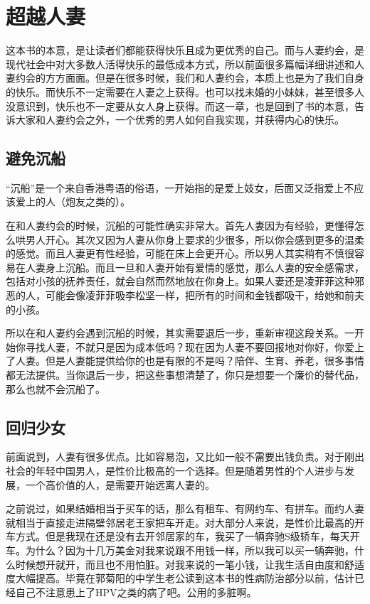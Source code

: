 \chapter{超越人妻}

这本书的本意，是让读者们都能获得快乐且成为更优秀的自己。而与人妻约会，是现代社会中对大多数人活得快乐的最低成本方式，所以前面很多篇幅详细讲述和人妻约会的方方面面。但是在很多时候，我们和人妻约会，本质上也是为了我们自身的快乐。而快乐不一定需要在人妻之上获得。也可以找未婚的小妹妹，甚至很多人没意识到，快乐也不一定要从女人身上获得。而这一章，也是回到了书的本意，告诉大家和人妻约会之外，一个优秀的男人如何自我实现，并获得内心的快乐。

\section{避免沉船}

``沉船''是一个来自香港粤语的俗语，一开始指的是爱上妓女，后面又泛指爱上不应该爱上的人（炮友之类的）。

在和人妻约会的时候，沉船的可能性确实非常大。首先人妻因为有经验，更懂得怎么哄男人开心。其次又因为人妻从你身上要求的少很多，所以你会感到更多的温柔的感觉。而且人妻更有性经验，可能在床上会更开心。所以男人其实稍有不慎很容易在人妻身上沉船。而且一旦和人妻开始有爱情的感觉，那么人妻的安全感需求，包括对小孩的抚养责任，就会自然而然地放在你身上。如果人妻还是凌菲菲这种邪恶的人，可能会像凌菲菲吸李松坚一样，把所有的时间和金钱都吸干，给她和前夫的小孩。

所以在和人妻约会遇到沉船的时候，其实需要退后一步，重新审视这段关系。一开始你寻找人妻，不就只是因为成本低吗？现在因为人妻不要回报地对你好，你爱上了人妻。但是人妻能提供给你的也是有限的不是吗？陪伴、生育、养老，很多事情都无法提供。当你退后一步，把这些事想清楚了，你只是想要一个廉价的替代品，那么也就不会沉船了。

\section{回归少女}

前面说到，人妻有很多优点。比如容易泡，又比如一般不需要出钱负责。对于刚出社会的年轻中国男人，是性价比极高的一个选择。但是随着男性的个人进步与发展，一个高价值的人，是需要开始远离人妻的。

之前说过，如果结婚相当于买车的话，那么有租车、有网约车、有拼车。而约人妻就相当于直接走进隔壁邻居老王家把车开走。对大部分人来说，是性价比最高的开车方式。但是我现在还是没有去开邻居家的车，我买了一辆奔驰S级轿车，每天开车。为什么？因为十几万美金对我来说跟不用钱一样，所以我可以买一辆奔驰，什么时候想开就开，而且也不用怕脏。对我来说的一笔小钱，让我生活自由度和舒适度大幅提高。毕竟在郭菊阳的中学生老公读到这本书的性病防治部分以前，估计已经自己不注意患上了HPV之类的病了吧。公用的多脏啊。

